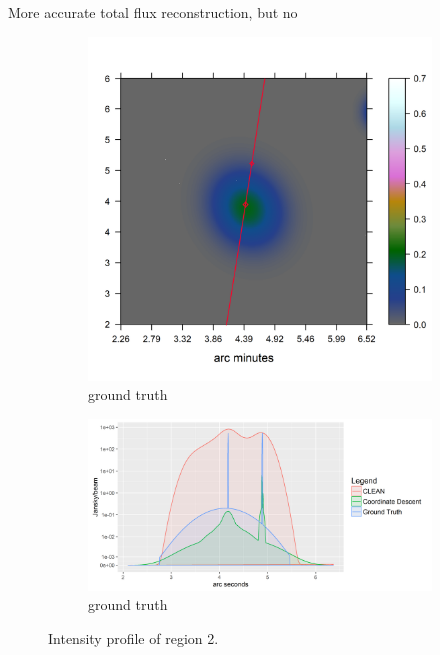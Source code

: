 More accurate total flux reconstruction, but no

\begin{figure}[h]
	\centering
	\begin{subfigure}[b]{0.3\linewidth}
		\includegraphics[width=\linewidth, trim={0.4in, 0.9in, 3.2in, 1.8in}, clip]{./chapters/20.results/mixed/mixed_cut_model2_line.png}
		\caption{ground truth}
		\label{results:mixed:cut1:img}
	\end{subfigure}
	\begin{subfigure}[b]{0.6\linewidth}
		\includegraphics[width=\linewidth, trim={0, 0, 0.2in, 0.2in}, clip]{./chapters/20.results/mixed/mixed_cut2.png}
		\caption{ground truth}
		\label{results:mixed:cut1:profile}
	\end{subfigure}
	\caption{Intensity profile of region 2.}
	\label{results:mixed:cut1:contour}
\end{figure}

